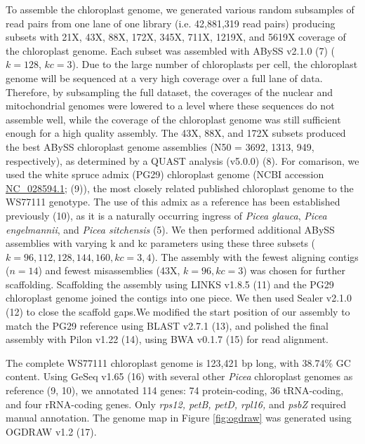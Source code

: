 \documentclass[titlepage,11pt, oneside]{article}   	%
\begin{document}
To assemble the chloroplast genome, we generated various random subsamples of read pairs from one lane of one library (i.e. 42,881,319 read pairs) producing subsets with 21X, 43X, 88X, 172X, 345X, 711X, 1219X, and 5619X coverage of the chloroplast genome. Each subset was assembled with ABySS v2.1.0 (7) ($k=128$, $kc=3$). Due to the large number of chloroplasts per cell, the chloroplast genome will be sequenced at a very high coverage over a full lane of data. Therefore, by subsampling the full dataset, the coverages of the nuclear and mitochondrial genomes were lowered to a level where these sequences do not assemble well, while the coverage of the chloroplast genome was still sufficient enough for a high quality assembly. The 43X, 88X, and 172X subsets produced the best ABySS chloroplast genome assemblies (N50 = 3692, 1313, 949, respectively), as determined by a QUAST analysis (v5.0.0) (8). For comarison, we used the white spruce admix (PG29) chloroplast genome (NCBI accession \href{https://www.ncbi.nlm.nih.gov/nuccore/NC_028594.1}{NC\_028594.1}; (9)), the most closely related published chloroplast genome to the WS77111 genotype. The use of this admix as a reference has been established previously (10), as it is a naturally occurring ingress of \textit{Picea glauca}, \textit{Picea engelmannii}, and \textit{Picea sitchensis} (5). We then performed additional ABySS assemblies with varying k and kc parameters using these three subsets ($k=96, 112, 128, 144, 160, kc=3, 4$). The assembly with the fewest aligning contigs ($n=14$) and fewest misassemblies (43X, $k=96, kc=3$) was chosen for further scaffolding. Scaffolding the assembly using LINKS v1.8.5 (11) and the PG29 chloroplast genome joined the contigs into one piece. We then used Sealer v2.1.0 (12) to close the scaffold gaps.We modified the start position of our assembly to match the PG29 reference using BLAST v2.7.1 (13), and polished the final assembly with Pilon v1.22 (14), using BWA v0.1.7 (15) for read alignment.
\newline
\par
The complete WS77111 chloroplast genome is 123,421 bp long, with 38.74\% GC content. Using GeSeq v1.65 (16) with several other \textit{Picea} chloroplast genomes as reference (9, 10), we annotated 114 genes: 74 protein-coding, 36 tRNA-coding, and four rRNA-coding genes. Only \textit{rps12, petB, petD, rpl16,} and \textit{psbZ} required manual annotation. The genome map in Figure \ref{fig:ogdraw} was generated using OGDRAW v1.2 (17).
\newline
\par
\end{document}
